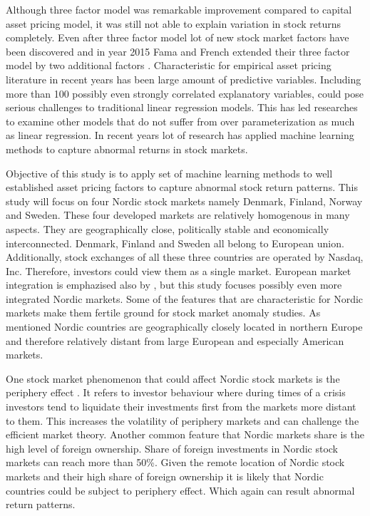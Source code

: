 \documentclass[12pt]{article}
\begin{document}
Although three factor model was remarkable improvement compared to capital asset pricing model, it was still not able to explain variation in stock returns completely. Even after three factor model lot of new stock market factors have been discovered and in year 2015 Fama and French extended their three factor model by two additional factors \citep{FAMA20151}. Characteristic for empirical asset pricing literature in recent years has been large amount of predictive variables. Including more than 100 possibly even strongly correlated explanatory variables, could pose serious challenges to traditional linear regression models. This has led researches to examine other models that do not suffer from over parameterization as much as linear regression. In recent years lot of research has applied machine learning methods to capture abnormal returns in stock markets.  \par

Objective of this study is to apply set of machine learning methods to well established asset pricing factors to capture abnormal stock return patterns. This study will focus on four Nordic stock markets namely Denmark, Finland, Norway and Sweden. These four developed markets are relatively homogenous in many aspects. They are geographically close, politically stable and economically interconnected. Denmark, Finland and Sweden all belong to European union. Additionally, stock exchanges of all these three countries are operated by Nasdaq, Inc. Therefore, investors could view them as a single market. European market integration is emphazised also by \citet{FAMA2012457}, but this study focuses possibly even more integrated Nordic markets. Some of the features that are characteristic for Nordic markets make them fertile ground for stock market anomaly studies. As mentioned Nordic countries are geographically closely located in northern Europe and therefore relatively distant from large European and especially American markets.  \par

One stock market phenomenon that could affect Nordic stock markets is the periphery effect \citep{leivo2011}. It refers to investor behaviour where during times of a crisis investors tend to liquidate their investments first from the markets more distant to them. This increases the volatility of periphery markets and can challenge the efficient market theory. Another common feature that Nordic markets share is the high level of foreign ownership. Share of foreign investments in Nordic stock markets can reach more than 50\%\footnotemark. Given the remote location of Nordic stock markets and their high share of foreign ownership it is likely that Nordic countries could be subject to periphery effect. Which again can result abnormal return patterns. \par
\end{document}
